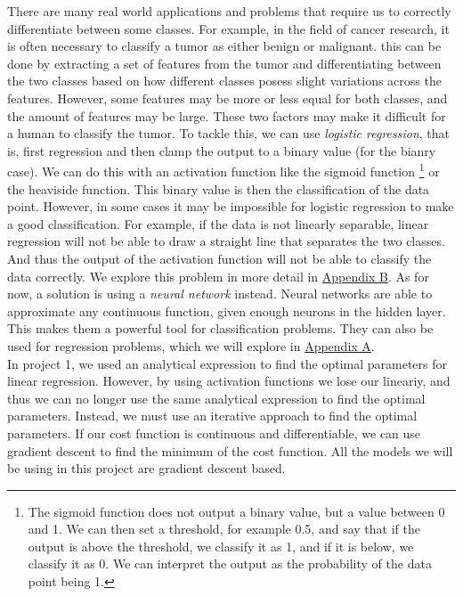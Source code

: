 \documentclass[twoside,11pt]{report}
\begin{document}
    There are many real world applications and problems that require us to correctly differentiate 
    between some classes. For example, in the field of
    cancer research, it is often necessary to classify a tumor as either benign or malignant. this
    can be done by extracting a set of features from the tumor and differentiating between the two
    classes based on how different classes posess slight variations across the features. 
    However, some features may be more or less equal for both classes, and the
    amount of features may be large. These two factors may make it difficult for a human to classify the tumor.
    To tackle this, we can use \emph{logistic regression}, that is, first regression and then clamp the 
    output to a binary value (for the bianry case). We can do this with an activation function like the sigmoid function
    \footnote
    {
        The sigmoid function does not output a binary value, but a value between 0 and 1. 
        We can then set a threshold, for example 0.5, and say that if the output is above the threshold, 
        we classify it as 1, and if it is below, we classify it as 0. We can interpret the output as the 
        probability of the data point being 1.
    }
    or the heaviside function. This binary value is then the classification of the data point.
    However, in some cases it may be impossible for logistic regression to make a good classification.
    For example, if the data is not linearly separable, linear regression will not be able to draw a
    straight line that separates the two classes. And thus the output of the activation function will
    not be able to classify the data correctly. We explore this problem in more detail in 
    \hyperref[app:appendixB]{Appendix B}. As for now, a solution is using a \emph{neural network} instead.
    Neural networks are able to approximate any continuous function, given enough neurons in the hidden layer.
    This makes them a powerful tool for classification problems. They can also be used for regression problems,
    which we will explore in \hyperref[app:appendixA]{Appendix A}.\\
    
    \noindent
    In project 1\cite{MachineLearningProjects_2023}, we used an analytical expression to find the optimal parameters
    for linear regression. However, by using activation functions we lose our lineariy, and thus we can no longer
    use the same analytical expression to find the optimal parameters. Instead, we must use an iterative approach
    to find the optimal parameters. If our cost function is continuous and differentiable, we can use gradient descent
    to find the minimum of the cost function. All the models we will be using in this project are gradient descent based.
\end{document}
